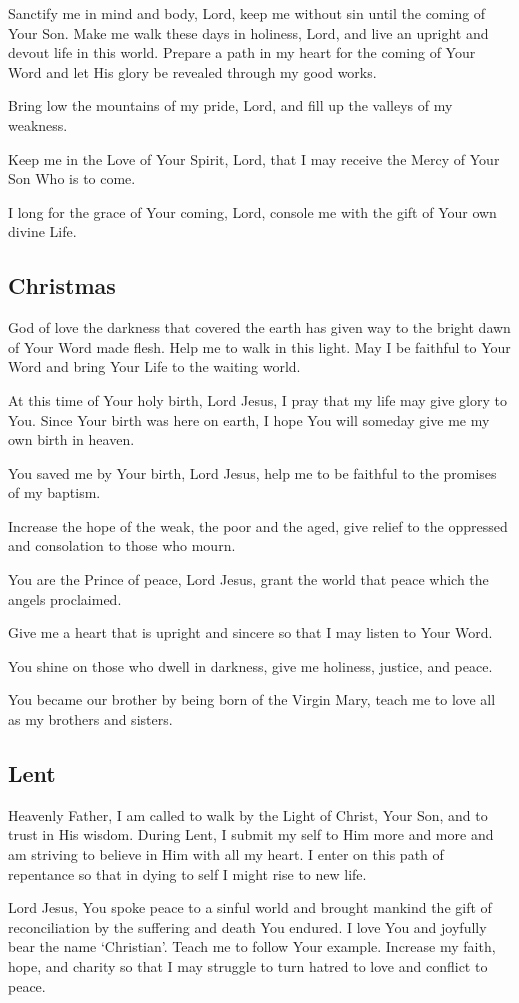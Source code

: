 \documentclass[12pt]{article}
\newcommand{\prayertitle}[1]{\subsection{#1}}
\begin{document}
Sanctify me in mind and body, Lord, keep me without sin until the coming of Your Son.
Make me walk these days in holiness, Lord, and live an upright and devout life in this world.
Prepare a path in my heart for the coming of Your Word and let His glory be revealed through my good works.

Bring low the mountains of my pride, Lord, and fill up the valleys of my weakness.

Keep me in the Love of Your Spirit, Lord, that I may receive the Mercy of Your Son Who is to come.

I long for the grace of Your coming, Lord, console me with the gift of Your own divine Life.

\prayertitle{Christmas}
God of love the darkness that covered the earth has given way to the bright dawn of Your Word made flesh.
Help me to walk in this light.
May I be faithful to Your Word and bring Your Life to the waiting world.

At this time of Your holy birth, Lord Jesus, I pray that my life may give glory to You.
Since Your birth was here on earth, I hope You will someday give me my own birth in heaven.

You saved me by Your birth, Lord Jesus, help me to be faithful to the promises of my baptism.

Increase the hope of the weak, the poor and the aged, give relief to the oppressed and consolation to those who mourn.

You are the Prince of peace, Lord Jesus, grant the world that peace which the angels proclaimed.

Give me a heart that is upright and sincere so that I may listen to Your Word.

You shine on those who dwell in darkness, give me holiness, justice, and peace.

You became our brother by being born of the Virgin Mary, teach me to love all as my brothers and sisters.

\prayertitle{Lent}
Heavenly Father, I am called to walk by the Light of Christ, Your Son, and to trust in His wisdom.
During Lent, I submit my self to Him more and more and am striving to believe in Him with all my heart.
I enter on this path of repentance so that in dying to self I might rise to new life.

Lord Jesus, You spoke peace to a sinful world and brought mankind the gift of reconciliation by the suffering and death You endured.
I love You and joyfully bear the name `Christian'.
Teach me to follow Your example.
Increase my faith, hope, and charity so that I may struggle to turn hatred to love and conflict to peace.
\end{document}
